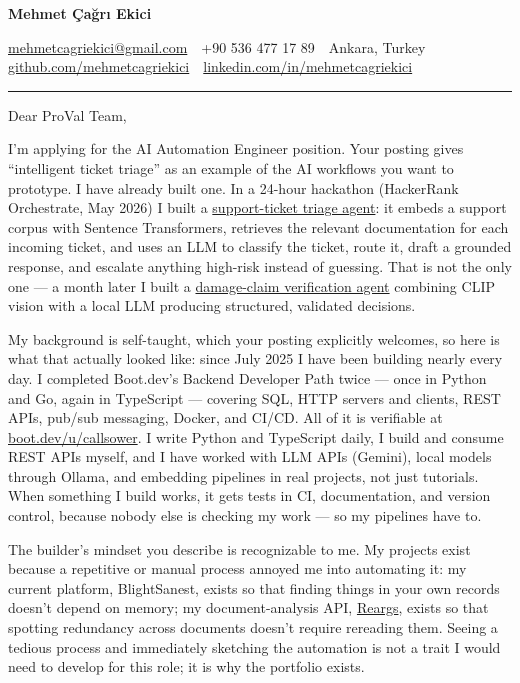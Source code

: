 \documentclass[11pt,a4paper]{article}
\begin{document}
{\LARGE\bfseries\color{accent} Mehmet Çağrı Ekici}\par
\vspace{2pt}
{\small
\href{mailto:mehmetcagriekici@gmail.com}{mehmetcagriekici@gmail.com} \,\textbullet\,
+90 536 477 17 89 \,\textbullet\,
Ankara, Turkey \,\textbullet\,
\href{https://github.com/mehmetcagriekici}{github.com/mehmetcagriekici} \,\textbullet\,
\href{https://linkedin.com/in/mehmetcagriekici}{linkedin.com/in/mehmetcagriekici}
}

\vspace{10pt}
\hrule
\vspace{14pt}

Dear ProVal Team,

I'm applying for the AI Automation Engineer position. Your posting gives ``intelligent ticket triage'' as an example of the AI workflows you want to prototype. I have already built one. In a 24-hour hackathon (HackerRank Orchestrate, May 2026) I built a \href{https://github.com/mehmetcagriekici/hackerrank-orchestrate-may26}{support-ticket triage agent}: it embeds a support corpus with Sentence Transformers, retrieves the relevant documentation for each incoming ticket, and uses an LLM to classify the ticket, route it, draft a grounded response, and escalate anything high-risk instead of guessing. That is not the only one --- a month later I built a \href{https://github.com/mehmetcagriekici/hackerrank-orchestrate-june26}{damage-claim verification agent} combining CLIP vision with a local LLM producing structured, validated decisions.

My background is self-taught, which your posting explicitly welcomes, so here is what that actually looked like: since July 2025 I have been building nearly every day. I completed Boot.dev's Backend Developer Path twice --- once in Python and Go, again in TypeScript --- covering SQL, HTTP servers and clients, REST APIs, pub/sub messaging, Docker, and CI/CD. All of it is verifiable at \href{https://www.boot.dev/u/callsower}{boot.dev/u/callsower}. I write Python and TypeScript daily, I build and consume REST APIs myself, and I have worked with LLM APIs (Gemini), local models through Ollama, and embedding pipelines in real projects, not just tutorials. When something I build works, it gets tests in CI, documentation, and version control, because nobody else is checking my work --- so my pipelines have to.

The builder's mindset you describe is recognizable to me. My projects exist because a repetitive or manual process annoyed me into automating it: my current platform, BlightSanest, exists so that finding things in your own records doesn't depend on memory; my document-analysis API, \href{https://github.com/mehmetcagriekici/reargs}{Reargs}, exists so that spotting redundancy across documents doesn't require rereading them. Seeing a tedious process and immediately sketching the automation is not a trait I would need to develop for this role; it is why the portfolio exists.
\end{document}
